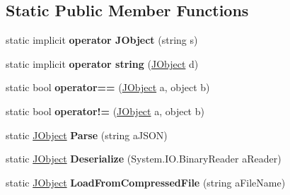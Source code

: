 \subsection*{Static Public Member Functions}
\begin{DoxyCompactItemize}
\item 
\hypertarget{class_simple_j_s_o_n_1_1_j_object_accd9e1974de63682d474674fada6f0ad}{static implicit {\bfseries operator J\+Object} (string s)}\label{class_simple_j_s_o_n_1_1_j_object_accd9e1974de63682d474674fada6f0ad}

\item 
\hypertarget{class_simple_j_s_o_n_1_1_j_object_a349e3db677ed7df0fd81d17dbf445c40}{static implicit {\bfseries operator string} (\hyperlink{class_simple_j_s_o_n_1_1_j_object}{J\+Object} d)}\label{class_simple_j_s_o_n_1_1_j_object_a349e3db677ed7df0fd81d17dbf445c40}

\item 
\hypertarget{class_simple_j_s_o_n_1_1_j_object_a096ac52170ad09478fec8bb432381272}{static bool {\bfseries operator==} (\hyperlink{class_simple_j_s_o_n_1_1_j_object}{J\+Object} a, object b)}\label{class_simple_j_s_o_n_1_1_j_object_a096ac52170ad09478fec8bb432381272}

\item 
\hypertarget{class_simple_j_s_o_n_1_1_j_object_ab32515362d0478ab2c9c33b503103e98}{static bool {\bfseries operator!=} (\hyperlink{class_simple_j_s_o_n_1_1_j_object}{J\+Object} a, object b)}\label{class_simple_j_s_o_n_1_1_j_object_ab32515362d0478ab2c9c33b503103e98}

\item 
\hypertarget{class_simple_j_s_o_n_1_1_j_object_a63e00254acb3024be791925220ead0f3}{static \hyperlink{class_simple_j_s_o_n_1_1_j_object}{J\+Object} {\bfseries Parse} (string a\+J\+S\+O\+N)}\label{class_simple_j_s_o_n_1_1_j_object_a63e00254acb3024be791925220ead0f3}

\item 
\hypertarget{class_simple_j_s_o_n_1_1_j_object_afdeb0a329677b935ded78ec0b3ade16d}{static \hyperlink{class_simple_j_s_o_n_1_1_j_object}{J\+Object} {\bfseries Deserialize} (System.\+I\+O.\+Binary\+Reader a\+Reader)}\label{class_simple_j_s_o_n_1_1_j_object_afdeb0a329677b935ded78ec0b3ade16d}

\item 
\hypertarget{class_simple_j_s_o_n_1_1_j_object_aac385ec722684ec0e3d337d66a14020d}{static \hyperlink{class_simple_j_s_o_n_1_1_j_object}{J\+Object} {\bfseries Load\+From\+Compressed\+File} (string a\+File\+Name)}\label{class_simple_j_s_o_n_1_1_j_object_aac385ec722684ec0e3d337d66a14020d}


\end{DoxyCompactItemize}
